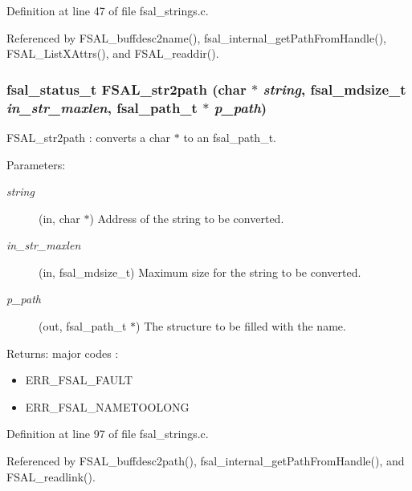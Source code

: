 Definition at line 47 of file fsal\_\-strings.c.

Referenced by FSAL\_\-buffdesc2name(), fsal\_\-internal\_\-getPathFromHandle(), FSAL\_\-ListXAttrs(), and FSAL\_\-readdir().
\subsubsection[{FSAL\_\-str2path}]{\setlength{\rightskip}{0pt plus 5cm}fsal\_\-status\_\-t FSAL\_\-str2path (char $\ast$ {\em string}, \/  fsal\_\-mdsize\_\-t {\em in\_\-str\_\-maxlen}, \/  fsal\_\-path\_\-t $\ast$ {\em p\_\-path})}\label{group__FSALNameFunctions_g77a250fef8b55ed3e672e9f136f705b6}


FSAL\_\-str2path : converts a char $\ast$ to an fsal\_\-path\_\-t.

\begin{Desc}
\item[Parameters:]
\begin{description}
\item[{\em string}](in, char $\ast$) Address of the string to be converted. \item[{\em in\_\-str\_\-maxlen}](in, fsal\_\-mdsize\_\-t) Maximum size for the string to be converted. \item[{\em p\_\-path}](out, fsal\_\-path\_\-t $\ast$) The structure to be filled with the name.\end{description}
\end{Desc}
\begin{Desc}
\item[Returns:]major codes :\begin{itemize}
\item ERR\_\-FSAL\_\-FAULT\item ERR\_\-FSAL\_\-NAMETOOLONG \end{itemize}
\end{Desc}


Definition at line 97 of file fsal\_\-strings.c.

Referenced by FSAL\_\-buffdesc2path(), fsal\_\-internal\_\-getPathFromHandle(), and FSAL\_\-readlink().
